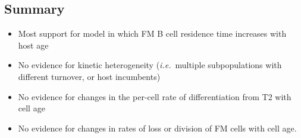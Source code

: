 \documentclass[11pt]{article}
\newcommand{\ie}{\textit{i.e.}}
\newcommand{\khi}{Ki67$^\text{hi}$}
\newcommand{\klo}{Ki67$^\text{lo}$}
\begin{document}
\subsection*{Summary}
\begin{itemize}
\item Most support for model in which FM B cell residence time increases with host age
\item No evidence for kinetic heterogeneity (\ie\ multiple subpopulations with different turnover, or host incumbents) 
\item No evidence for changes in the per-cell rate of differentiation from T2 with cell age
\item No evidence for changes in rates of loss or division of FM cells with cell age.
\end{itemize}

\end{document}
